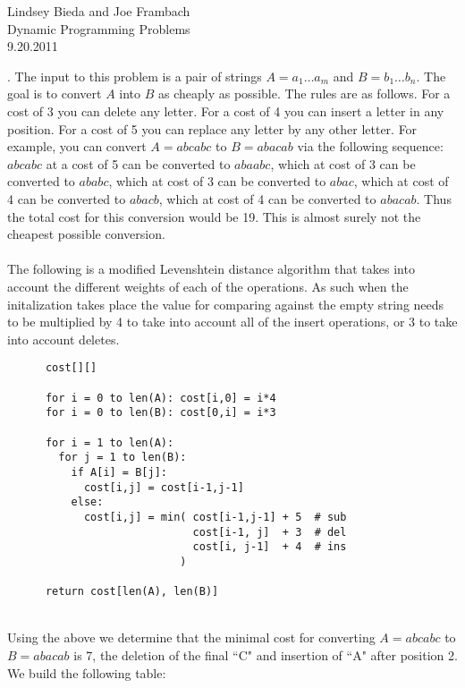 \documentclass[10pt]{article}
\begin{document}
	\begin{flushright}
	Lindsey Bieda and Joe Frambach\\
	Dynamic Programming Problems\\
	9.20.2011
	\end{flushright}
	. The input to this problem is a pair of strings $A = a_1 \ldots a_m$ and $B = b_1 \ldots b_n$. The goal is to convert
	$A$ into $B$ as cheaply as possible. The rules are as follows. For a cost of 3 you can delete any letter.
	For a cost of 4 you can insert a letter in any position. For a cost of 5 you can replace any letter by
	any other letter. For example, you can convert $A = abcabc$ to $B = abacab$ via the following sequence:
	$abcabc$ at a cost of 5 can be converted to $abaabc$, which at cost of 3 can be converted to $ababc$, which
	at cost of 3 can be converted to $abac$, which at cost of 4 can be converted to $abacb$, which at cost of 4
	can be converted to $abacab$. Thus the total cost for this conversion would be 19. This is almost surely
	not the cheapest possible conversion.\\
	\\
	The following is a modified Levenshtein distance algorithm that takes into account the different weights
	of each of the operations. As such when the initalization takes place the value for comparing against the 
	empty string needs to be multiplied by 4 to take into account all of the insert operations, or 3 to take into account deletes. 
	\begin{verbatim}
	  cost[][]
	  
	  for i = 0 to len(A): cost[i,0] = i*4
	  for i = 0 to len(B): cost[0,i] = i*3
	  
	  for i = 1 to len(A):
	    for j = 1 to len(B):
	      if A[i] = B[j]:
	        cost[i,j] = cost[i-1,j-1]
	      else:
	        cost[i,j] = min( cost[i-1,j-1] + 5  # sub
	                         cost[i-1, j]  + 3  # del
	                         cost[i, j-1]  + 4  # ins 
	                       )
	                         
	  return cost[len(A), len(B)]
	\end{verbatim}
	\\
	Using the above we determine that the minimal cost for converting $A = abcabc$ to $B = abacab$ is 7, the deletion
	of the final ``C" and insertion of ``A" after position 2. We build the following table:\\
\end{document}
